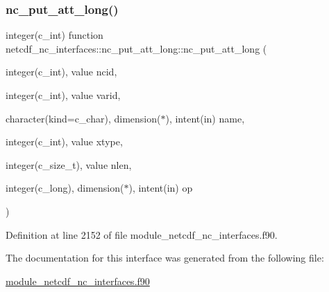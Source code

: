 \subsubsection{\texorpdfstring{nc\+\_\+put\+\_\+att\+\_\+long()}{nc\_put\_att\_long()}}
{\footnotesize\ttfamily integer(c\+\_\+int) function netcdf\+\_\+nc\+\_\+interfaces\+::nc\+\_\+put\+\_\+att\+\_\+long\+::nc\+\_\+put\+\_\+att\+\_\+long (\begin{DoxyParamCaption}\item[{integer(c\+\_\+int), value}]{ncid,  }\item[{integer(c\+\_\+int), value}]{varid,  }\item[{character(kind=c\+\_\+char), dimension($\ast$), intent(in)}]{name,  }\item[{integer(c\+\_\+int), value}]{xtype,  }\item[{integer(c\+\_\+size\+\_\+t), value}]{nlen,  }\item[{integer(c\+\_\+long), dimension($\ast$), intent(in)}]{op }\end{DoxyParamCaption})}



Definition at line 2152 of file module\+\_\+netcdf\+\_\+nc\+\_\+interfaces.\+f90.



The documentation for this interface was generated from the following file\+:\begin{DoxyCompactItemize}
\item 
\hyperlink{module__netcdf__nc__interfaces_8f90}{module\+\_\+netcdf\+\_\+nc\+\_\+interfaces.\+f90}\end{DoxyCompactItemize}
